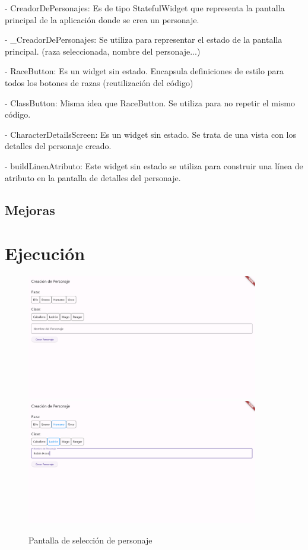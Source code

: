 \documentclass{article}
\begin{document}
- CreadorDePersonajes: 
Es de tipo StatefulWidget que representa la pantalla principal de la aplicación donde se crea un personaje. 

- _CreadorDePersonajes: 
    Se utiliza para representar el estado de la pantalla principal. (raza seleccionada, nombre del personaje...)

- RaceButton:
    Es un widget sin estado. Encapsula definiciones de estilo para todos los botones de razas (reutilización del código)

- ClassButton: 
    Misma idea que RaceButton. Se utiliza para no repetir el mismo código.

- CharacterDetailsScreen: 
    Es un widget sin estado. Se trata de una vista con los detalles del personaje creado.
    

- buildLineaAtributo:
    Este widget sin estado  se utiliza para construir una línea de atributo en la pantalla de detalles del personaje.



    \subsection{Mejoras}



\newpage
\section{Ejecución}

\begin{figure}[h]
    \centering
    \vspace{5pt}
    \includegraphics[width=0.9\textwidth]{Ejecucion_1.png}
    \includegraphics[width=0.9\textwidth]{Ejecucion_2.png}
    \caption{Pantalla de selección de personaje}
    \label{fig:ejecucion_1}
\end{figure}
\end{document}
